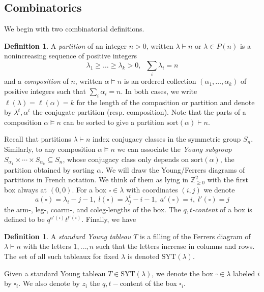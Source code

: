 \documentclass{amsart}
\numberwithin{equation}{section}
\theoremstyle{definition}
\newtheorem{definition}[lemma]{Definition}%
\newcommand{\Z}{{\mathbb Z}}
\begin{document}
\subsection{Combinatorics}
We begin with two combinatorial definitions.
\begin{definition}
\label{def:partition}
A {\em partition} of an integer $n>0$, written $\lambda\vdash n$ or $\lambda\in P(n)$ is a nonincreasing sequence of positive integers  
$$\lambda_1\geq \ldots\geq \lambda_k>0,\;\;\sum_i\lambda_i=n$$ and a {\em composition} of $n$, written $\alpha \vDash n$ is an ordered collection $(\alpha_1,\ldots,\alpha_k)$ of positive integers such that $\sum_i \alpha_i=n$. In both cases, we write $\ell(\lambda)=\ell(\alpha)=k$ for the length of the composition or partition and denote by $\lambda^t, \alpha^t$ the conjugate partition (resp. composition). Note that the parts of a composition $\alpha\vDash n$ can be sorted to give a partition $\text{sort}(\alpha)\vdash n$.
\end{definition}
Recall that partitions $\lambda\vdash n$ index conjugacy classes in the symmetric group $S_n$. Similarly, to any composition $\alpha \vDash n$ we can associate the {\em Young subgroup} $S_{\alpha_1}\times\cdots \times S_{\alpha_k}\subseteq S_n$, whose conjugacy class only depends on $\text{sort}(\alpha)$, the partition obtained by sorting $\alpha$.
We will draw the Young/Ferrers diagrams of partitions in French notation. We think of them as lying in $\Z^2_{\geq 0}$ with the first box always at $(0,0)$.
For a box $\square\in \lambda$ with coordinates $(i,j)$ we denote 
\begin{equation}
    \label{eq:armslegs}
    a(\square)=\lambda_i-j-1, \; l(\square)=\lambda^t_j-i-1, \; a'(\square)=i, \; l'(\square)=j
\end{equation}
the arm-, leg-, coarm-, and coleg-lengths of the box. The {\em $q,t$-content} of a box is defined to be $q^{a'(\square)}t^{l'(\square)}$. 
Finally, we have
\begin{definition}
A {\em standard Young tableau} $T$ is a filling of the Ferrers diagram of $\lambda\vdash n$ with the letters $1,\ldots,n$ such that the letters increase in columns and rows. The set of all such tableaux for fixed $\lambda$ is denoted $\text{SYT}(\lambda)$.
\end{definition}
Given a standard Young tableau $T\in \text{SYT}(\lambda)$, we denote the box $\square\in \lambda$ labeled $i$ by $\square_i$. %
We also denote by $z_i$ the $q,t-$content of the box $\square_i$. 
\end{document}
